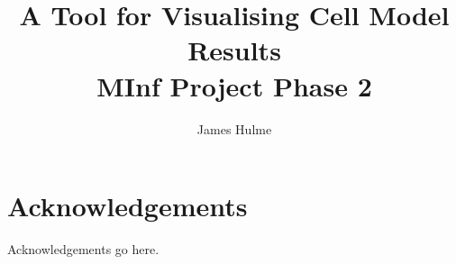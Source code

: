 \documentclass[bsc, frontabs, twoside, singlespacing, parskip]{infthesis}
\begin{document}
\title{A Tool for Visualising Cell Model Results \\
       MInf Project Phase 2}
\author{James Hulme}

\maketitle

\section*{Acknowledgements}
Acknowledgements go here.

\thispagestyle{empty}

\newpage


\thispagestyle{empty}

\newpage

\tableofcontents
\thispagestyle{empty}

\clearpage
\setcounter{page}{1}





%


\clearpage
%




\end{document}
